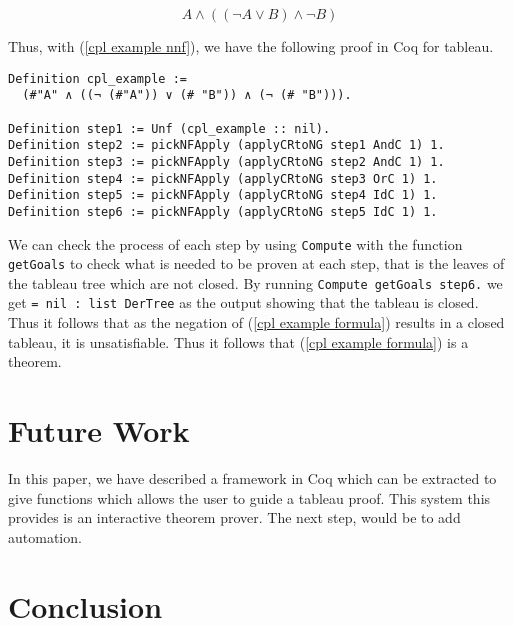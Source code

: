 \documentclass{llncs}
\begin{document}
\begin{equation}
A \wedge ((\neg A \vee B) \wedge \neg B)
\label{cpl example nnf}
\end{equation}

Thus, with (\ref{cpl example nnf}), we have the following proof in Coq for
tableau.

\begin{verbatim}
Definition cpl_example :=
  (#"A" ∧ ((¬ (#"A")) ∨ (# "B")) ∧ (¬ (# "B"))).

Definition step1 := Unf (cpl_example :: nil).
Definition step2 := pickNFApply (applyCRtoNG step1 AndC 1) 1.
Definition step3 := pickNFApply (applyCRtoNG step2 AndC 1) 1.
Definition step4 := pickNFApply (applyCRtoNG step3 OrC 1) 1.
Definition step5 := pickNFApply (applyCRtoNG step4 IdC 1) 1.
Definition step6 := pickNFApply (applyCRtoNG step5 IdC 1) 1.
\end{verbatim}

We can check the process of each step by using \verb+Compute+ with the function
\verb+getGoals+ to check what is needed to be proven at each step, that is the
leaves of the tableau tree which are not closed.
By running \verb+Compute getGoals step6.+ we get \verb+= nil : list DerTree+ as
the output showing that the tableau is closed. Thus it follows that as the
negation of (\ref{cpl example formula}) results in a closed tableau, it is 
unsatisfiable. Thus it follows that (\ref{cpl example formula}) is a theorem.

\section{Future Work}

In this paper, we have described a framework in Coq which can be extracted to
give functions which allows the user to guide a tableau proof. This system this
provides is an interactive theorem prover. The next step, would be to add
automation. 

\section{Conclusion}
\end{document}
